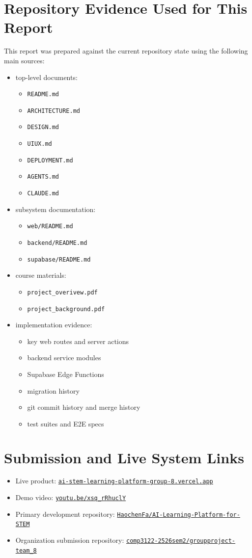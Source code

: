 \documentclass[11pt,a4paper]{article}
\newcommand{\LiveProductUrl}{\href{https://ai-stem-learning-platform-group-8.vercel.app/}{\nolinkurl{ai-stem-learning-platform-group-8.vercel.app}}}
\newcommand{\DemoVideoUrl}{\href{https://youtu.be/xsq_rRhuclY}{\nolinkurl{youtu.be/xsq_rRhuclY}}}
\newcommand{\PrimaryRepoUrl}{\href{https://github.com/HaochenFa/AI-Learning-Platform-for-STEM}{\nolinkurl{HaochenFa/AI-Learning-Platform-for-STEM}}}
\newcommand{\SubmissionRepoUrl}{\href{https://github.com/comp3122-2526sem2/groupproject-team_8}{\nolinkurl{comp3122-2526sem2/groupproject-team_8}}}
\begin{document}
\newpage
\appendix

\section{Repository Evidence Used for This Report}

This report was prepared against the current repository state using the following main sources:

\begin{itemize}
  \item top-level documents:
  \begin{itemize}
    \item \texttt{README.md}
    \item \texttt{ARCHITECTURE.md}
    \item \texttt{DESIGN.md}
    \item \texttt{UIUX.md}
    \item \texttt{DEPLOYMENT.md}
    \item \texttt{AGENTS.md}
    \item \texttt{CLAUDE.md}
  \end{itemize}
  \item subsystem documentation:
  \begin{itemize}
    \item \texttt{web/README.md}
    \item \texttt{backend/README.md}
    \item \texttt{supabase/README.md}
  \end{itemize}
  \item course materials:
  \begin{itemize}
    \item \texttt{project\_overivew.pdf}
    \item \texttt{project\_background.pdf}
  \end{itemize}
  \item implementation evidence:
  \begin{itemize}
    \item key web routes and server actions
    \item backend service modules
    \item Supabase Edge Functions
    \item migration history
    \item git commit history and merge history
    \item test suites and E2E specs
  \end{itemize}
\end{itemize}

\section{Submission and Live System Links}

\begin{itemize}
  \item Live product: \LiveProductUrl
  \item Demo video: \DemoVideoUrl
  \item Primary development repository: \PrimaryRepoUrl
  \item Organization submission repository: \SubmissionRepoUrl
\end{itemize}
\end{document}
